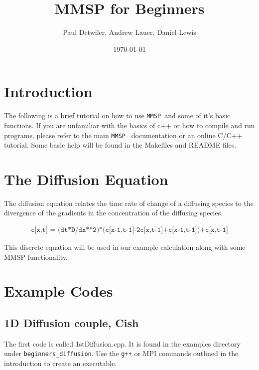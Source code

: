 \documentclass[10pt]{article}
\title{MMSP for Beginners}
\author{Paul Detwiler, Andrew Lauer, Daniel Lewis}
\date{\today}
\def\MMSP{{\tt MMSP\ }}
\begin{document}
\maketitle
\section{Introduction}
The following is a brief tutorial on how to use \MMSP and some of it's
basic functions. If you are unfamiliar with the basics of c++ or how
to compile and run programs, please refer to the main \MMSP
documentation or an online C/C++ tutorial.  Some basic help will be
found in the Makefiles and README files.

\section{The Diffusion Equation}

The diffusion equation relates the time rate of change of a diffusing
species to the divergence of the gradients in the concentration of the
diffusing species.

\begin{eqnarray}
\texttt{c[x,t] = (dt*D/dx**2)*(c[x-1,t-1]-2c[x,t-1]+c[x-1,t-1])+c[x,t-1]}
\end{eqnarray}

This discrete equation will be used in our example calculation along with
some MMSP functionality.

\section{Example Codes}
\label{sec:examples}

\begin{listings}
\end{listings}

\subsection{1D Diffusion couple, Cish}

The first code is called 1stDiffusion.cpp.  It is found in the
examples directory under {\tt beginners\_diffusion}. Use the {\tt g++}
or MPI commands outlined in the introduction to create an executable.
\end{document}
